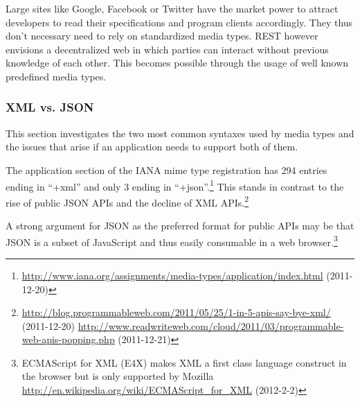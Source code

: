 \documentclass[12pt,a4paper,twoside]{scrartcl}		%
\newcommand{\citeurl}[2]{\url{#1} (#2)}
\begin{document}
Large sites like Google, Facebook or Twitter have the market power to attract
developers to read their specifications and program clients accordingly. They
thus don't necessary need to rely on standardized media types. REST however
envisions a decentralized web in which parties can interact without previous
knowledge of each other. This becomes possible through the usage of well known
predefined media types.


\subsubsection{XML vs. JSON}


This section investigates the two most common syntaxes used by media types
and the issues that arise if an application needs to support both of them.

The application section of the IANA mime type registration has 294 entries
ending in ``+xml'' and only 3 ending in
``+json''.\footnote{\citeurl{http://www.iana.org/assignments/media-types/application/index.html}{2011-12-20}}
This stands in contrast to the rise of public JSON APIs and the decline of XML
APIs.\footnote{\citeurl{http://blog.programmableweb.com/2011/05/25/1-in-5-apis-say-bye-xml/}{2011-12-20} \citeurl{http://www.readwriteweb.com/cloud/2011/03/programmable-web-apis-popping.php}{2011-12-21}}

A strong argument for JSON as the preferred format for public APIs may be that
JSON is a subset of JavaScript and thus easily consumable in a web
browser.\footnote{ECMAScript for XML (E4X) makes XML a first class language
  construct in the browser but is only supported by Mozilla
  \citeurl{http://en.wikipedia.org/wiki/ECMAScript_for_XML}{2012-2-2}}
\end{document}
